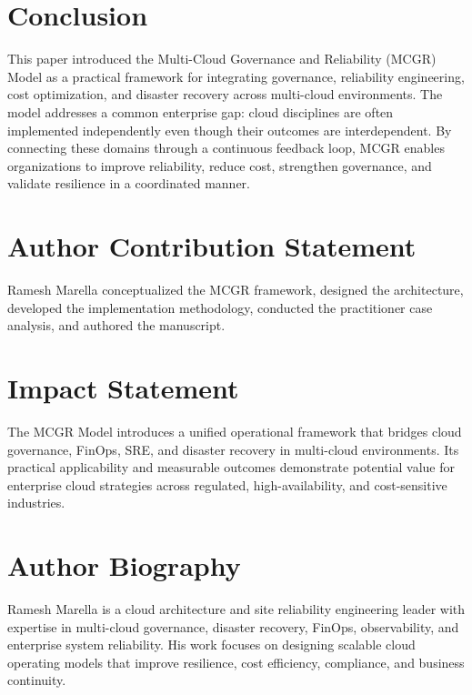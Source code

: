 \documentclass[conference]{IEEEtran}
\begin{document}
\section{Conclusion}
This paper introduced the Multi-Cloud Governance and Reliability (MCGR) Model as a practical framework for integrating governance, reliability engineering, cost optimization, and disaster recovery across multi-cloud environments. The model addresses a common enterprise gap: cloud disciplines are often implemented independently even though their outcomes are interdependent. By connecting these domains through a continuous feedback loop, MCGR enables organizations to improve reliability, reduce cost, strengthen governance, and validate resilience in a coordinated manner.

\section*{Author Contribution Statement}
Ramesh Marella conceptualized the MCGR framework, designed the architecture, developed the implementation methodology, conducted the practitioner case analysis, and authored the manuscript.

\section*{Impact Statement}
The MCGR Model introduces a unified operational framework that bridges cloud governance, FinOps, SRE, and disaster recovery in multi-cloud environments. Its practical applicability and measurable outcomes demonstrate potential value for enterprise cloud strategies across regulated, high-availability, and cost-sensitive industries.

\section*{Author Biography}
Ramesh Marella is a cloud architecture and site reliability engineering leader with expertise in multi-cloud governance, disaster recovery, FinOps, observability, and enterprise system reliability. His work focuses on designing scalable cloud operating models that improve resilience, cost efficiency, compliance, and business continuity.



\end{document}
